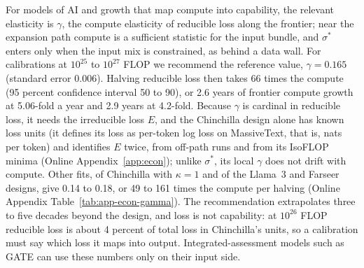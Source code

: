 For models of AI and growth that map compute into capability, the relevant elasticity is $\gamma$, the compute
elasticity of reducible loss along the frontier; near the expansion path compute is a sufficient statistic for the
input bundle, and $\sigma^*$ enters only when the input mix is constrained, as behind a data wall. For calibrations at
$10^{25}$ to $10^{27}$ FLOP we recommend the reference value, $\gamma=0.165$ (standard error 0.006). Halving reducible
loss then takes 66 times the compute (95 percent confidence interval 50 to 90), or 2.6 years of frontier compute growth
at 5.06-fold a year and 2.9 years at 4.2-fold. Because $\gamma$ is cardinal in reducible loss, it needs the irreducible
loss $E$, and the Chinchilla design \citep{hoffmann2022training} alone has known loss units (it defines its loss as
per-token log loss on MassiveText, that is, nats per token) and identifies $E$ twice, from off-path runs and from its
IsoFLOP minima (Online Appendix~\ref{app:econ}); unlike $\sigma^*$, its local $\gamma$ does not drift with compute.
Other fits, of Chinchilla with $\kappa=1$ and of the Llama~3 and Farseer designs, give 0.14 to 0.18, or 49 to 161 times
the compute per halving (Online Appendix Table~\ref{tab:app-econ-gamma}). The recommendation extrapolates three to five decades beyond the design, and loss is not capability: at $10^{26}$ FLOP
reducible loss is about 4 percent of total loss in Chinchilla's units, so a calibration must say which loss it maps into
output. Integrated-assessment models such as GATE \citep{erdil2025gate} can use these numbers only on their input
side.
